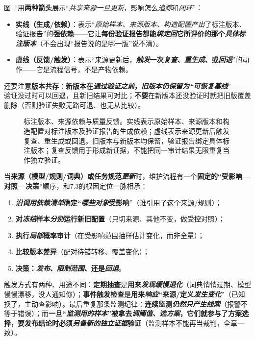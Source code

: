 图~\ref{fig:knowledge-quality-assessment-correction-version-feedback}用\textbf{两种箭头}展示“\emph{共享来源一旦更新}，影响怎么\emph{追踪}和\emph{闭环}”：
\begin{itemize}\item \textbf{实线（生成/依赖）}：表示“\emph{原始样本、来源版本、构造配置}\emph{产出}了标注版本、验证报告”的\textbf{强依赖}——它让\textbf{每份验证报告都能\emph{绑定回}它所评价的那个\emph{具体标注版本}}（不会出现“报告说的是哪一版”说不清）。\item \textbf{虚线（反馈/触发）}：表示“来源更新后，\textbf{\emph{触发}一次\emph{复查}、\emph{重生成}、或\emph{回退}}”的动作——它是流程信号，不是产物依赖。\end{itemize}
还要注意\textbf{版本共存}：\textbf{新版本在\emph{通过验证之前}，\emph{旧版本仍保留为“可恢复基线}}”——验证没过时可以回退，且新旧结果可对比；\textbf{不要}在新版本还没验证时就把旧版覆盖删除（否则验证失败无路可退、也无从比较）。

\begin{figure}[htbp]
  \centering
  
  \caption{标注版本、来源依赖与质量反馈。实线表示原始样本、来源版本和构造配置对标注版本及验证报告的生成依赖；虚线表示来源更新后触发复查、重生成或回退。旧版本与新版本均保留，验证报告绑定具体标注版本；复查反馈用于形成新证据，不能把同一审计结果无限重复当作独立验证。}
  \label{fig:knowledge-quality-assessment-correction-version-feedback}
\end{figure}

当\textbf{来源（模型/规则/词典）或任务规范\emph{更新}}时，维护流程有一个\textbf{固定的“受影响—对照—决策}”顺序，和7.3的根因定位一脉相承：
\begin{enumerate}\item \textbf{\emph{沿调用依赖清单}确定“\emph{哪些对象}受影响}”（谁引用了这个来源/规则）；\item \textbf{对\emph{冻结}样本\emph{分别}运行新旧配置}（只切来源、其他不变，做受控对照）；\item \textbf{执行\emph{局部}概率审计}（在受影响范围抽样估计变化，而非全量）；\item \textbf{比较版本差异}（配对待错转移、覆盖变化）；\item \textbf{决策：\emph{发布}、\emph{限制范围}、还是\emph{回退}}。\end{enumerate}
触发方式有两种、用途不同：\textbf{定期抽查}是\textbf{用来\emph{发现缓慢退化}}（词典悄悄过期、模型慢慢漂移，没人通知你）；\textbf{事件触发检查}是\textbf{用来\emph{响应}“来源/定义\emph{发生变化}}”（已知换了，主动查影响）。最后重复那条监测纪律：\textbf{连续监测\emph{仍然只产生线索}}（报警不等于错误）；而\textbf{一旦“\emph{监测用的样本}”被拿去\emph{调阈值、选方案}，它们就参与了方案选择，\textbf{要发布结论时必须\emph{另备新的独立证据}}验证}（监测样本不能再当裁判，全章一致）。

